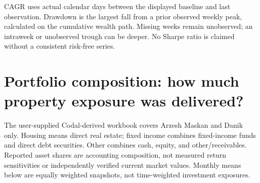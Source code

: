 \documentclass[11pt,a4paper]{article}
\begin{document}
CAGR uses actual calendar days between the displayed baseline and last observation. Drawdown is the largest fall from a prior observed weekly peak, calculated on the cumulative wealth path. Missing weeks remain unobserved; an intraweek or unobserved trough can be deeper. No Sharpe ratio is claimed without a consistent risk-free series.

\begin{center}
\small
{}
\end{center}

\section{Portfolio composition: how much property exposure was delivered?}

The user-supplied Codal-derived workbook covers Arzesh Maskan and Danik only. Housing means direct real estate; fixed income combines fixed-income funds and direct debt securities. Other combines cash, equity, and other/receivables. Reported asset shares are accounting composition, not measured return sensitivities or independently verified current market values. Monthly means below are equally weighted snapshots, not time-weighted investment exposures.

\begin{center}
\small
{}
\end{center}
\end{document}
